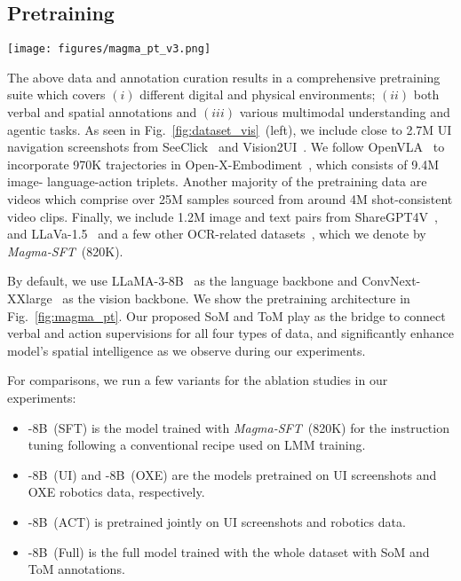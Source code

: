 \subsection{Pretraining}

\begin{figure*}
    \centering
    \texttt{[image: figures/magma\_pt\_v3.png]}
    \vspace{-0.5cm}
    \caption{Magma pretraining pipeline. For all training data, texts are tokenized into tokens, while images and videos from different domains are encoded by a shared vision encoder. The resulted discrete and continuous tokens are then fed into a LLM to generate the outputs in verbal, spatial and action types. Our proposed method reconcile the multimodal understanding and action prediction tasks.}
    \label{fig:magma_pt}
\end{figure*}

The above data and annotation curation results in a comprehensive pretraining suite which covers $(i)$ different digital and physical environments; $(ii)$ both verbal and spatial annotations and $(iii)$ various multimodal understanding and agentic tasks. As seen in Fig.~\ref{fig:dataset_vis}~(left), we include close to 2.7M UI navigation screenshots from SeeClick~\cite{seeclick} and Vision2UI~\cite{gui2024vision2uirealworlddatasetlayout}. We follow OpenVLA~\cite{kim2024openvla} to incorporate 970K trajectories in Open-X-Embodiment~\cite{open_x_embodiment_rt_x_2023}, which consists of 9.4M image-
language-action triplets. Another majority of the pretraining data are videos which comprise over 25M samples sourced from around 4M shot-consistent video clips. 
Finally, we include 1.2M image and text pairs from ShareGPT4V~\cite{chen2023sharegpt4v}, and LLaVa-1.5~\cite{liu2024improvedbaselinesvisualinstruction} and a few other OCR-related datasets~\cite{masry-etal-2022-chartqa,mathew2021infographicvqa}, which we denote by \textit{ Magma-SFT}~(820K). 

By default, we use LLaMA-3-8B~\cite{llama3} as the language backbone and ConvNext-XXlarge~\cite{liu2022convnet} as the vision backbone. We show the pretraining architecture in Fig.~\ref{fig:magma_pt}. Our proposed SoM and ToM play as the bridge to connect verbal and action supervisions for all four types of data, and significantly enhance model's spatial intelligence as we observe during our experiments.

For comparisons, we run a few variants for the ablation studies in our experiments:
\begin{itemize}
    \item {\magma-8B~(SFT)} is the model trained with \textit{Magma-SFT}~(820K) for the instruction tuning following a conventional recipe used on LMM training. 
    \item {\magma-8B~(UI)} and {\magma-8B~(OXE)} are the models pretrained on UI screenshots and OXE robotics data, respectively.
    \item {\magma-8B~(ACT)} is pretrained jointly on UI screenshots and robotics data.
    \item {\magma-8B~(Full)} is the full model trained with the whole dataset with SoM and ToM annotations.
\end{itemize}

